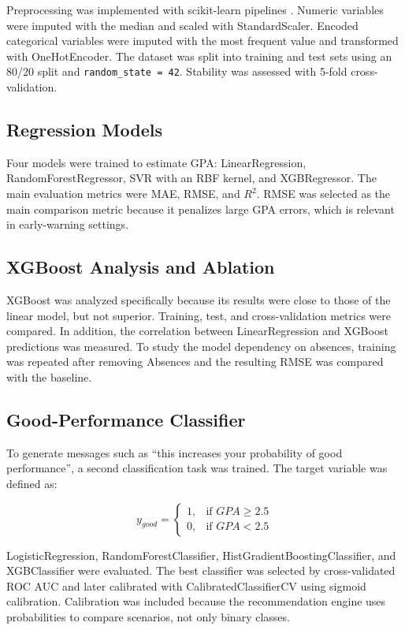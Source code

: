 \documentclass[12pt,onecolumn]{IEEEtran}
\begin{document}
Preprocessing was implemented with scikit-learn pipelines \cite{pedregosa2011scikit}. Numeric variables were imputed with the median and scaled with StandardScaler. Encoded categorical variables were imputed with the most frequent value and transformed with OneHotEncoder. The dataset was split into training and test sets using an 80/20 split and \texttt{random\_state = 42}. Stability was assessed with 5-fold cross-validation.

\subsection{Regression Models}

Four models were trained to estimate GPA: LinearRegression, RandomForestRegressor, SVR with an RBF kernel, and XGBRegressor. The main evaluation metrics were MAE, RMSE, and $R^2$. RMSE was selected as the main comparison metric because it penalizes large GPA errors, which is relevant in early-warning settings.

\subsection{XGBoost Analysis and Ablation}

XGBoost was analyzed specifically because its results were close to those of the linear model, but not superior. Training, test, and cross-validation metrics were compared. In addition, the correlation between LinearRegression and XGBoost predictions was measured. To study the model dependency on absences, training was repeated after removing Absences and the resulting RMSE was compared with the baseline.

\subsection{Good-Performance Classifier}

To generate messages such as ``this increases your probability of good performance'', a second classification task was trained. The target variable was defined as:

\begin{equation}
y_{good} =
\begin{cases}
1, & \text{if } GPA \geq 2.5\\
0, & \text{if } GPA < 2.5
\end{cases}
\end{equation}

LogisticRegression, RandomForestClassifier, HistGradientBoostingClassifier, and XGBClassifier were evaluated. The best classifier was selected by cross-validated ROC AUC and later calibrated with CalibratedClassifierCV using sigmoid calibration. Calibration was included because the recommendation engine uses probabilities to compare scenarios, not only binary classes.
\end{document}
